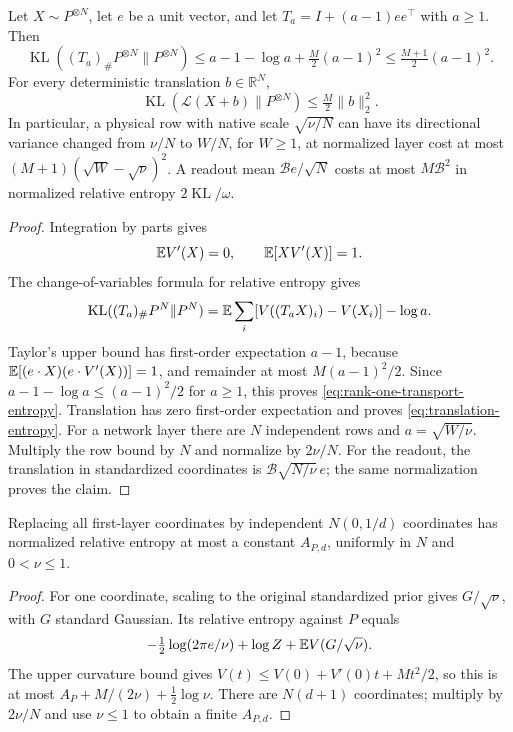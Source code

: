 \begin{lemma}
\label{lem:nongaussian-rank-one-entropy}
Let $X\sim P^{\otimes N}$, let $e$ be a unit vector, and let
$T_a=I+(a-1)ee^\top$ with $a\ge1$. Then
\begin{equation}
 \operatorname{KL}((T_a)_\#P^{\otimes N}\|P^{\otimes N})
 \le a-1-\log a+\tfrac M2(a-1)^2
 \le\tfrac{M+1}2(a-1)^2.
 \label{eq:rank-one-transport-entropy}
\end{equation}
For every deterministic translation $b\in\mathbb R^N$,
\begin{equation}
 \operatorname{KL}(\mathcal L(X+b)\|P^{\otimes N})
 \le\tfrac M2\|b\|_2^2.
 \label{eq:translation-entropy}
\end{equation}
In particular, a physical row with native scale $\sqrt{\nu/N}$
can have its directional variance changed from $\nu/N$ to $W/N$,
for $W\ge1$, at normalized layer cost at most
$(M+1)(\sqrt W-\sqrt\nu)^2$. A readout mean
$\mathcal B e/\sqrt N$ costs at most $M\mathcal B^2$ in normalized
relative entropy $2\operatorname{KL}/\omega$.
\end{lemma}
\begin{proof}
Integration by parts gives
\[
 \mathbb E V'(X)=0,\qquad \mathbb E[XV'(X)]=1.
\]
The change-of-variables formula for relative entropy gives
\[
 \operatorname{KL}((T_a)_\#P^N\|P^N)
 =\mathbb E\sum_i[V((T_aX)_i)-V(X_i)]-\log a.
\]
Taylor's upper bound has first-order expectation $a-1$, because
$\mathbb E[(e\cdot X)(e\cdot V'(X))]=1$, and remainder at most
$M(a-1)^2/2$. Since $a-1-\log a\le(a-1)^2/2$ for $a\ge1$, this
proves \eqref{eq:rank-one-transport-entropy}.
Translation has zero first-order expectation and proves
\eqref{eq:translation-entropy}.
For a network layer there are $N$ independent rows and
$a=\sqrt{W/\nu}$. Multiply the row bound by $N$ and normalize by
$2\nu/N$. For the readout, the translation in standardized
coordinates is $\mathcal B\sqrt{N/\nu}\,e$; the same normalization
proves the claim.
\end{proof}

\begin{lemma}
\label{lem:nongaussian-first-layer}
Replacing all first-layer coordinates by independent $N(0,1/d)$
coordinates has normalized relative entropy at most a constant
$A_{P,d}$, uniformly in $N$ and $0<\nu\le1$.
\end{lemma}
\begin{proof}
For one coordinate, scaling to the original standardized prior gives
$G/\sqrt\nu$, with $G$ standard Gaussian. Its relative entropy
against $P$ equals
\[
 -\tfrac12\log(2\pi e/\nu)+\log Z+\mathbb E V(G/\sqrt\nu).
\]
The upper curvature bound gives
$V(t)\le V(0)+V'(0)t+Mt^2/2$, so this is at most
$A_P+M/(2\nu)+\tfrac12\log\nu$.
There are $N(d+1)$ coordinates; multiply by $2\nu/N$ and use
$\nu\le1$ to obtain a finite $A_{P,d}$.
\end{proof}
